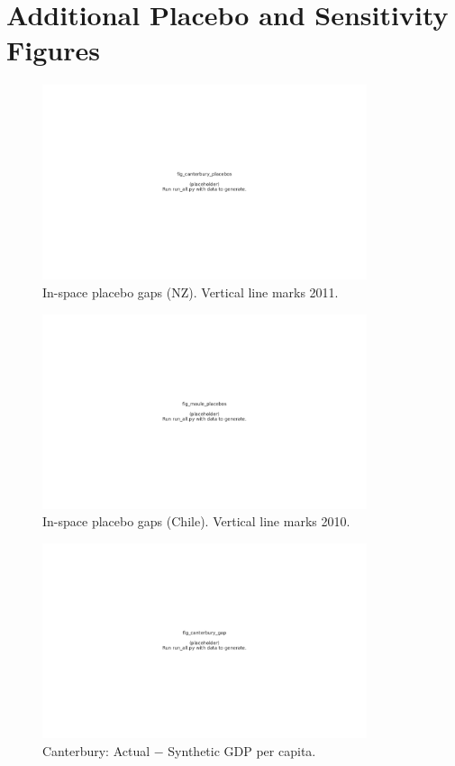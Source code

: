 \appendix
\section{Additional Placebo and Sensitivity Figures}\label{app:placebos}

\begin{figure}[H]
\centering
\includegraphics[width=0.85\textwidth]{figures/fig_canterbury_placebos.pdf}
\caption{In-space placebo gaps (NZ). Vertical line marks 2011.}
\label{fig:canterbury_placebos}
\end{figure}

\begin{figure}[H]
\centering
\includegraphics[width=0.85\textwidth]{figures/fig_maule_placebos.pdf}
\caption{In-space placebo gaps (Chile). Vertical line marks 2010.}
\label{fig:maule_placebos}
\end{figure}

\begin{figure}[H]
\centering
\includegraphics[width=0.85\textwidth]{figures/fig_canterbury_gap.pdf}
\caption{Canterbury: Actual $-$ Synthetic GDP per capita.}
\label{fig:canterbury_gap}
\end{figure}

